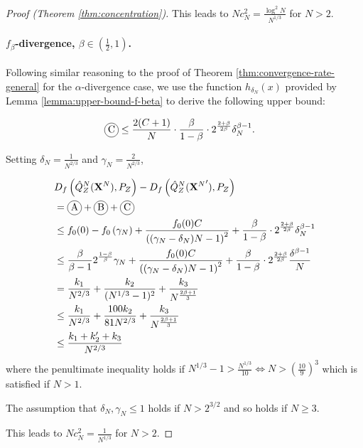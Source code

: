 \begin{proof}[Proof (Theorem \ref{thm:concentration})]
This leads to $Nc_N^2 = \frac{\log^2N}{N^{1/3}}$ for $N>2$.


\paragraph{$f_\beta$-divergence, $\beta\in(\frac{1}{2},1)$.}

Following similar reasoning to the proof of Theorem \ref{thm:convergence-rate-general} for the $\alpha$-divergence case, we use the function $h_{\delta_N}(x)$ provided by Lemma \ref{lemma:upper-bound-f-beta} to derive the following upper bound:


\begin{align*}
    \encircle{C} &\leq \frac{2(C+1)}{N} \cdot \frac{\beta}{1-\beta}\cdot 2^{\frac{2+\beta}{2\beta}}\delta_N^{\beta-1}.
\end{align*}

Setting $\delta_N = \frac{1}{N^{2/3}}$ and $\gamma_N =\frac{2}{N^{2/3}}$,

\begin{align*}
    &D_f\left( \hat{Q}_Z^N(\XN) , P_Z\right) - D_f\left( \hat{Q}_Z^N({\XN}') , P_Z\right) \\
    &= \encircle{A} + \encircle{B} + \encircle{C} \\
    &\leq f_0(0) - f_0\left(\gamma_N\right) + \frac{f_0(0)C}{\left((\gamma_N-\delta_N)N - 1\right)^2} + \frac{\beta}{1-\beta}\cdot 2^{\frac{2+\beta}{2\beta}}\delta_N^{\beta-1} \\
    &\leq \frac{\beta}{\beta-1}2^{\frac{1-\beta}{\beta}}\gamma_N + \frac{f_0(0)C}{\left((\gamma_N-\delta_N)N - 1\right)^2}+ \frac{\beta}{1-\beta}\cdot 2^{\frac{2+\beta}{2\beta}} \frac{ \delta^{\beta-1}}{N} \\
    &= \frac{k_1}{N^{2/3}} + \frac{k_2}{(N^{1/3} - 1)^2} + \frac{k_3}{N^\frac{2\beta + 1}{3}}\\
    &\leq \frac{k_1}{N^{2/3}} + \frac{100k_2}{81N^{2/3}} + \frac{k_3}{N^\frac{2\beta + 1}{3}}\\
    &\leq \frac{k_1+k'_2 + k_3}{N^{2/3}}
\end{align*}
where the penultimate inequality holds if $N^{1/3}-1 > \frac{N^{1/3}}{10} \iff N>\left(\frac{10}{9}\right)^3$ which is satisfied if $N>1$.

The assumption that $\delta_N, \gamma_N \leq 1$ holds if $N>2^{3/2}$ and so holds if $N\geq3$.

This leads to $Nc_N^2 = \frac{1}{N^{1/3}}$ for $N>2$.


\end{proof}

